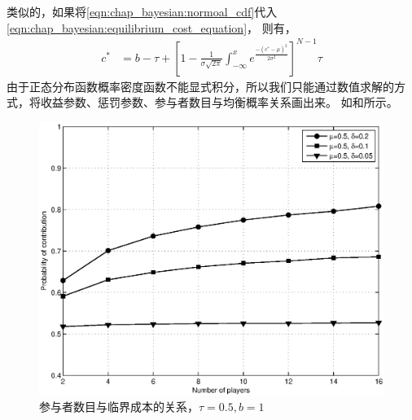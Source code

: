 类似的，如果将\eqref{eqn:chap_bayesian:normoal_cdf}代入\eqref{eqn:chap_bayesian:equilibrium_cost_equation}，
则有，
\begin{align} 
    c^* &= b - \tau + \left[ 1-\frac{1}{\sigma \sqrt{2\pi} } \int^x_{-\infty}e^{ \frac{-(c^*-\mu)^2}{2\sigma^2}} \right] ^{N-1}\tau
    \label{eqn:chap_bayesian:cost_normal_distribution_equation}
\end{align}
由于正态分布函数概率密度函数不能显式积分，所以我们只能通过数值求解的方式，将收益参数、惩罚参数、参与者数目与均衡概率关系画出来。
如和所示。
\begin{figure}[tb]
\begin{centering}
\includegraphics[scale=0.6]{bayesian_normal_user_number_vs_contribute_probability.eps}
\caption{参与者数目与临界成本的关系，$\tau=0.5, b=1$}
\label{fig:bayesian_normal_user_numb_vs_contr_prob}
\end{centering}
\end{figure}
